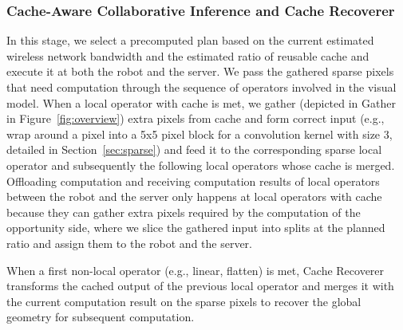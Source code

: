 \subsubsection{Cache-Aware Collaborative Inference and Cache Recoverer}
In this stage, we select a precomputed plan based on the current estimated wireless network bandwidth and the estimated ratio of reusable cache and execute it at both the robot and the server.
We pass the gathered sparse pixels that need computation through the sequence of operators involved in the visual model.
When a local operator with cache is met, we gather (depicted in Gather in Figure~\ref{fig:overview}) extra pixels from cache and form correct input (e.g., wrap around a pixel into a 5x5 pixel block for a convolution kernel with size 3, detailed in Section~\ref{sec:sparse}) and feed it to the corresponding sparse local operator and subsequently the following local operators whose cache is merged.
Offloading computation and receiving computation results of local operators between the robot and the server only happens at local operators with cache because they can gather extra pixels required by the computation of the opportunity side, where we slice the gathered input into splits at the planned ratio and assign them to the robot and the server.

When a first non-local operator (e.g., linear, flatten) is met, Cache Recoverer transforms the cached output of the previous local operator and merges it with the current computation result on the sparse pixels to recover the global geometry for subsequent computation.







